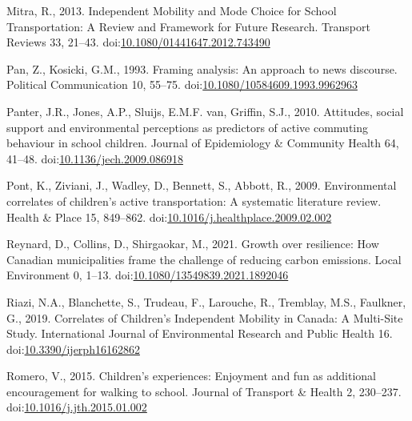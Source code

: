 \documentclass[]{elsarticle} %
\begin{document}
\leavevmode\hypertarget{ref-mitraIndependentMobilityMode2013}{}%
Mitra, R., 2013. Independent Mobility and Mode Choice for School
Transportation: A Review and Framework for Future Research. Transport
Reviews 33, 21--43.
doi:\href{https://doi.org/10.1080/01441647.2012.743490}{10.1080/01441647.2012.743490}

\leavevmode\hypertarget{ref-panFramingAnalysisApproach1993}{}%
Pan, Z., Kosicki, G.M., 1993. Framing analysis: An approach to news
discourse. Political Communication 10, 55--75.
doi:\href{https://doi.org/10.1080/10584609.1993.9962963}{10.1080/10584609.1993.9962963}

\leavevmode\hypertarget{ref-panterAttitudesSocialSupport2010}{}%
Panter, J.R., Jones, A.P., Sluijs, E.M.F. van, Griffin, S.J., 2010.
Attitudes, social support and environmental perceptions as predictors of
active commuting behaviour in school children. Journal of Epidemiology
\& Community Health 64, 41--48.
doi:\href{https://doi.org/10.1136/jech.2009.086918}{10.1136/jech.2009.086918}

\leavevmode\hypertarget{ref-pontEnvironmentalCorrelatesChildren2009}{}%
Pont, K., Ziviani, J., Wadley, D., Bennett, S., Abbott, R., 2009.
Environmental correlates of children's active transportation: A
systematic literature review. Health \& Place 15, 849--862.
doi:\href{https://doi.org/10.1016/j.healthplace.2009.02.002}{10.1016/j.healthplace.2009.02.002}

\leavevmode\hypertarget{ref-reynardGrowthResilienceHow2021}{}%
Reynard, D., Collins, D., Shirgaokar, M., 2021. Growth over resilience:
How Canadian municipalities frame the challenge of reducing carbon
emissions. Local Environment 0, 1--13.
doi:\href{https://doi.org/10.1080/13549839.2021.1892046}{10.1080/13549839.2021.1892046}

\leavevmode\hypertarget{ref-riaziCorrelatesChildrenIndependent2019}{}%
Riazi, N.A., Blanchette, S., Trudeau, F., Larouche, R., Tremblay, M.S.,
Faulkner, G., 2019. Correlates of Children's Independent Mobility in
Canada: A Multi-Site Study. International Journal of Environmental
Research and Public Health 16.
doi:\href{https://doi.org/10.3390/ijerph16162862}{10.3390/ijerph16162862}

\leavevmode\hypertarget{ref-romeroChildrenExperiencesEnjoyment2015}{}%
Romero, V., 2015. Children's experiences: Enjoyment and fun as
additional encouragement for walking to school. Journal of Transport \&
Health 2, 230--237.
doi:\href{https://doi.org/10.1016/j.jth.2015.01.002}{10.1016/j.jth.2015.01.002}
\end{document}
